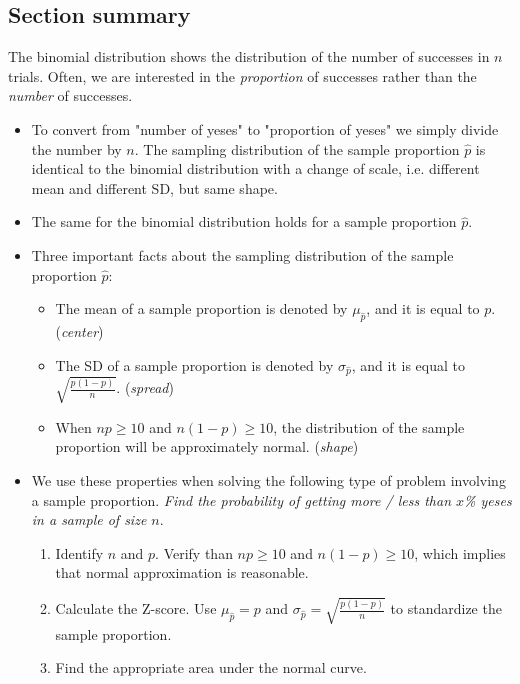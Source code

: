 \subsection*{Section summary}

\noindent The binomial distribution shows the distribution of the number of successes in $n$ trials.  Often, we are interested in the \textit{proportion} of successes rather than the \textit{number} of successes.
\begin{itemize}
\item To convert from "number of yeses" to "proportion of yeses" we simply divide the number by $n$.  The sampling distribution of the sample proportion $\hat{p}$ is identical to the binomial distribution with a change of scale, i.e. different mean and different SD, but same shape.

\item The same  for the binomial distribution holds for a sample proportion $\hat{p}$.

\item Three important facts about the sampling distribution of the sample proportion $\hat{p}$:
\begin{itemize}\vspace{-1mm}
\item The mean of a sample proportion is denoted by $\mu_{\hat{p}}$, and it is equal to $p$.  (\textit{center})
\item The SD of a sample proportion is denoted by $\sigma_{\hat{p}}$, and it is equal to $\sqrt{\frac{p(1-p)}{n}}$.  (\textit{spread})
\item When $np\ge 10$ and $n(1-p)\ge 10$, the distribution of the sample proportion will be approximately normal.   (\textit{shape})
\end{itemize}

\item We use these properties when solving the following type of  problem involving a sample proportion.  
\emph{Find the probability of getting more / less than $x$\% yeses in a sample of size $n$}.
\begin{enumerate}\vspace{-1mm}
\setlength{\itemsep}{0mm}
\item Identify $n$ and $p$. Verify than $np\ge 10$ and $n(1-p)\ge 10$, which implies that normal approximation is reasonable. 
\item Calculate the Z-score.  Use $\mu_{\hat{p}} = p$ and $\sigma_{\hat{p}} = \sqrt{\frac{p(1-p)}{n}}$ to standardize the sample proportion.  
\item Find the appropriate area under the normal curve.  \end{enumerate}

\end{itemize}

